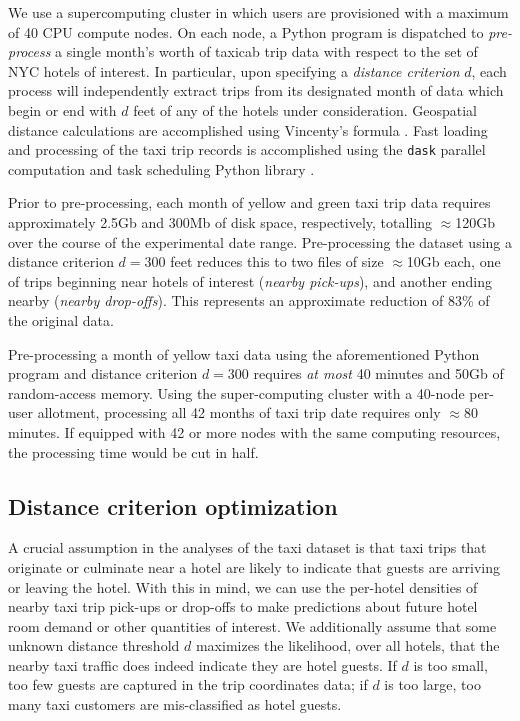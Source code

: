 \documentclass[useAMS, usenatbib]{biom}
\begin{document}
We use a supercomputing cluster in which users are provisioned with a maximum of 40 CPU compute nodes. On each node, a Python program is dispatched to \textit{pre-process} a single month's worth of taxicab trip data with respect to the set of NYC hotels of interest. In particular, upon specifying a \textit{distance criterion} $d$, each process will independently extract trips from its designated month of data which begin or end with $d$ feet of any of the hotels under consideration. Geospatial distance calculations are accomplished using Vincenty's formula \citep{bessel_calculation_2010}. Fast loading and processing of the taxi trip records is accomplished using the \texttt{dask} parallel computation and task scheduling Python library \citep{dask}.

Prior to pre-processing, each month of yellow and green taxi trip data requires approximately 2.5Gb and 300Mb of disk space, respectively, totalling $\approx$120Gb over the course of the experimental date range. Pre-processing the dataset using a distance criterion $d = 300$ feet reduces this to two files of size $\approx$10Gb each, one of trips beginning near hotels of interest (\textit{nearby pick-ups}), and another ending nearby (\textit{nearby drop-offs}). This represents an approximate reduction of 83\% of the original data.

Pre-processing a month of yellow taxi data using the aforementioned Python program and distance criterion $d = 300$ requires \textit{at most} 40 minutes and 50Gb of random-access memory. Using the super-computing cluster with a 40-node per-user allotment, processing all 42 months of taxi trip date requires only $\approx$80 minutes. If equipped with 42 or more nodes with the same computing resources, the processing time would be cut in half.

\subsection{Distance criterion optimization}

A crucial assumption in the analyses of the taxi dataset is that taxi trips that originate or culminate near a hotel are likely to indicate that guests are arriving or leaving the hotel. With this in mind, we can use the per-hotel densities of nearby taxi trip pick-ups or drop-offs to make predictions about future hotel room demand or other quantities of interest. We additionally assume that some unknown distance threshold $d$ maximizes the likelihood, over all hotels, that the nearby taxi traffic does indeed indicate they are hotel guests. If $d$ is too small, too few guests are captured in the trip coordinates data; if $d$ is too large, too many taxi customers are mis-classified as hotel guests.
\end{document}
